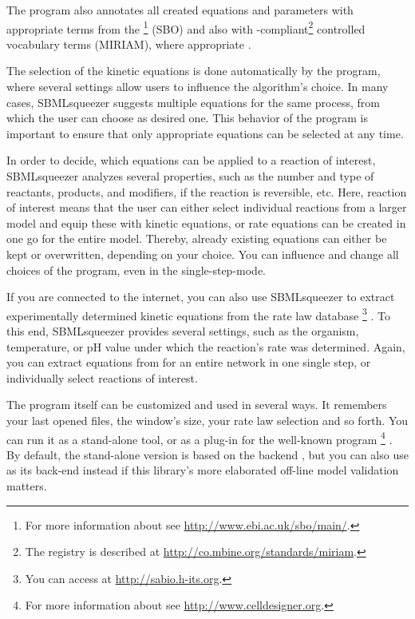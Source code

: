 The program also annotates all created equations and parameters with appropriate
terms from the \SBO\footnote{For more information about \SBO see \url{http://www.ebi.ac.uk/sbo/main/}.}
(\acl{SBO}) and also
with \MIRIAM-compliant\footnote{The \MIRIAM registry is described at \url{http://co.mbine.org/standards/miriam}.}
controlled vocabulary terms (\acl{MIRIAM}), where appropriate \citep{Le2005, Novere2006b, Laible2007, Courtot2011}.

The selection of the kinetic equations is done automatically by the program,
where several settings allow users to influence the algorithm's choice.
In many cases, SBMLsqueezer suggests multiple equations for the same process,
from which the user can choose as desired one.
This behavior of the program is important to ensure that only appropriate
equations can be selected at any time.

In order to decide, which equations can be applied to a reaction of interest,
SBMLsqueezer analyzes several properties, such as the number and type of
reactants, products, and modifiers, if the reaction is reversible, etc.
Here, reaction of interest means that the user can either select individual
reactions from a larger model and equip these with kinetic equations, or rate
equations can be created in one go for the entire model.
Thereby, already existing equations can either be kept or overwritten, depending
on your choice.
You can influence and change all choices of the program, even in the single-step-mode.

If you are connected to the internet, you can also use SBMLsqueezer to extract
experimentally determined kinetic equations from the rate law database
\SABIO\footnote{You can access \SABIO at \url{http://sabio.h-its.org}.}
\citep{Wittig2006, Rojas2007, Krebs2007, Wittig2012}.
To this end, SBMLsqueezer provides several settings, such as the organism,
temperature, or pH value under which the reaction's rate was determined. Again,
you can extract equations from \SABIO for an entire network in one single step, or
individually select reactions of interest.

The program itself can be customized and used in several ways. It remembers your
last opened files, the window's size, your rate law selection and so forth.
You can run it as a stand-alone tool, or as a plug-in for the well-known program
\CellDesigner\footnote{For more information about \CellDesigner see \url{http://www.celldesigner.org}.}
\citep{Funahashi2003, Funahashi2006, Funahashi2007a, Funahashi2008}.
By default, the stand-alone version is based on the \JSBML backend 
\citep{Draeger2011b}, but you can also use \libSBML \citep{Bornstein2008} as its
\SBML back-end instead if this library's more elaborated off-line model validation
matters.

